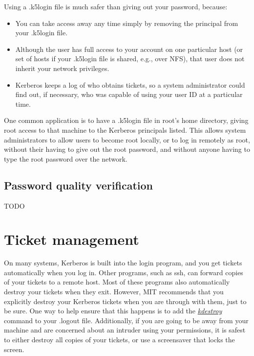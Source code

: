 \documentclass[letterpaper,10pt,english]{sphinxmanual}
\begin{document}
Using a .k5login file is much safer than giving out your password,
because:
\begin{itemize}
\item {} 
You can take access away any time simply by removing the principal
from your .k5login file.

\item {} 
Although the user has full access to your account on one particular
host (or set of hosts if your .k5login file is shared, e.g., over
NFS), that user does not inherit your network privileges.

\item {} 
Kerberos keeps a log of who obtains tickets, so a system
administrator could find out, if necessary, who was capable of using
your user ID at a particular time.

\end{itemize}

One common application is to have a .k5login file in root's home
directory, giving root access to that machine to the Kerberos
principals listed.  This allows system administrators to allow users
to become root locally, or to log in remotely as root, without their
having to give out the root password, and without anyone having to
type the root password over the network.


\section{Password quality verification}
\label{user/pwd_mgmt:password-quality-verification}
TODO


\chapter{Ticket management}
\label{user/tkt_mgmt:ticket-management}\label{user/tkt_mgmt::doc}
On many systems, Kerberos is built into the login program, and you get
tickets automatically when you log in.  Other programs, such as ssh,
can forward copies of your tickets to a remote host.  Most of these
programs also automatically destroy your tickets when they exit.
However, MIT recommends that you explicitly destroy your Kerberos
tickets when you are through with them, just to be sure.  One way to
help ensure that this happens is to add the {\hyperref[user/user_commands/kdestroy:kdestroy-1]{\emph{kdestroy}}} command
to your .logout file.  Additionally, if you are going to be away from
your machine and are concerned about an intruder using your
permissions, it is safest to either destroy all copies of your
tickets, or use a screensaver that locks the screen.
\end{document}
